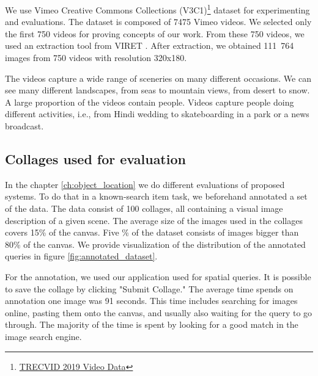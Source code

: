 We use Vimeo Creative Commons Collections (V3C1)\footnote{\href{https://www-nlpir.nist.gov/projects/tv2019/data.html}{TRECVID 2019 Video Data}} dataset for experimenting and evaluations. The dataset is composed of 7475 Vimeo videos. We selected only the first 750 videos for proving concepts of our work. From these 750 videos, we used an extraction tool from VIRET \cite{lokovc2019framework}. After extraction, we obtained 111\ 764 images from 750 videos with resolution 320x180.

The videos capture a wide range of sceneries on many different occasions. We can see many different landscapes, from seas to mountain views, from desert to snow. A large proportion of the videos contain people. Videos capture people doing different activities, i.e., from Hindi wedding to skateboarding in a park or a news broadcast.

\subsection{Collages used for evaluation}

In the chapter \ref{ch:object_location} we do different evaluations of proposed systems. To do that in a known-search item task, we beforehand annotated a set of the data. The data consist of 100 collages, all containing a visual image description of a given scene. The average size of the images used in the collages covers 15\% of the canvas. Five \% of the dataset consists of images bigger than 80\% of the canvas. We provide visualization of the distribution of the annotated queries in figure \ref{fig:annotated_dataset}.

For the annotation, we used our application used for spatial queries. It is possible to save the collage by clicking "Submit Collage." The average time spends on annotation one image was 91 seconds. This time includes searching for images online, pasting them onto the canvas, and usually also waiting for the query to go through. The majority of the time is spent by looking for a good match in the image search engine.

